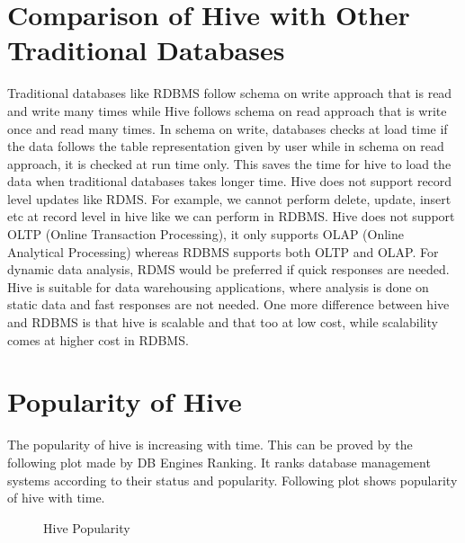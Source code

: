\documentclass[9pt,twocolumn,twoside]{../../styles/osajnl}
\begin{document}
\section{Comparison of Hive with Other Traditional Databases}
Traditional databases like RDBMS follow schema on write approach that is read and write many times while Hive follows schema on read approach that is write once and read many times.\newline
In schema on write, databases checks at load time if the data follows the table representation given by user while in schema on read approach, it is checked at run time only. This saves the time for hive to load the data when traditional databases takes longer time.  \newline
Hive does not support record level updates like RDMS. For example, we cannot perform delete, update, insert etc at record level in hive like we can perform in RDBMS.\newline
Hive does not support OLTP (Online Transaction Processing), it only supports OLAP (Online Analytical Processing) whereas RDBMS supports both OLTP and OLAP.\newline
For dynamic data analysis, RDMS would be preferred if quick responses are needed. Hive is suitable for data warehousing applications, where analysis is done on static data and fast responses are not needed. \newline
One more difference between hive and RDBMS is that hive is scalable and that too at low cost, while scalability comes at higher cost in RDBMS.\cite{p2}

\section{Popularity of Hive}
The popularity of hive is increasing with time. This can be proved by the following plot made by DB Engines Ranking. It ranks database management systems according to their status and popularity.
Following plot shows popularity of hive with time.

\begin{figure}[htbp]
	\centering
	\caption{Hive Popularity}
	\label{fig:HivePopularity}
\end{figure}
\cite{rank}
\end{document}

